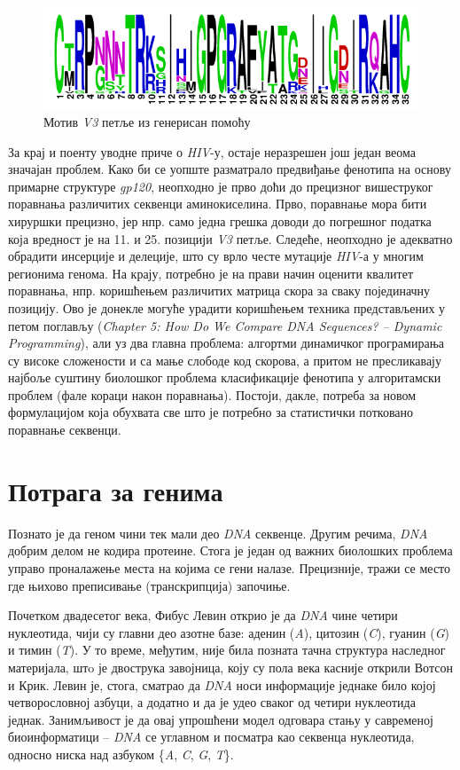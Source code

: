 \documentclass[12pt,oneside]{memoir}
\begin{document}
\begin{CJK}{UTF8}{ipxm}
\begin{figure}[!ht]
  \centering
  \includegraphics[width=.75\textwidth]{motif.png}
  \caption{Мотив \textit{V3} петље из \cite{compeau2015} генерисан помоћу \cite{weblogo}}
  \label{fig:motif}
\end{figure}

За крај и поенту уводне приче о \textit{HIV}-у, остаје неразрешен још један веома значајан проблем. Како би се уопште разматрало предвиђање фенотипа на основу примарне структуре \textit{gp120}, неопходно је прво доћи до прецизног вишеструког поравнања различитих секвенци аминокиселина. Прво, поравнање мора бити хируршки прецизно, јер нпр. само једна грешка доводи до погрешног податка која вредност је на 11. и 25. позицији \textit{V3} петље. Следеће, неопходно је адекватно обрадити инсерције и делеције, што су врло честе мутације \textit{HIV}-а у многим регионима генома. На крају, потребно је на прави начин оценити квалитет поравнања, нпр. коришћењем различитих матрица скора за сваку појединачну позицију. Ово је донекле могуће урадити коришћењем техника представљених у петом поглављу (\textit{Chapter 5: How Do We Compare DNA Sequences? -- Dynamic Programming}), али уз два главна проблема: алгортми динамичког програмирања су високе сложености и са мање слободе код скорова, а притом не пресликавају најбоље суштину биолошког проблема класификације фенотипа у алгоритамски проблем (фале кораци након поравнања). Постоји, дакле, потреба за новом формулацијом која обухвата све што је потребно за статистички потковано поравнање секвенци.

\section{Потрага за генима}
Познато је да геном чини тек мали део \textit{DNA} секвенце. Другим речима, \textit{DNA} добрим делом не кодира протеине. Стога је један од важних биолошких проблема управо проналажење места на којима се гени налазе. Прецизније, тражи се место где њихово преписивање (транскрипција) започиње.

Почетком двадесетог века, Фибус Левин открио је да \textit{DNA} чине четири нуклеотида\cite{levene1910}, чији су главни део азотне базе: аденин (\textit{A}), цитозин (\textit{C}), гуанин (\textit{G}) и тимин (\textit{T}). У то време, међутим, није била позната тачна структура наследног материјала, штo је двострука завојница, коју су пола века касније открили Вотсон и Крик\cite{watson1953}. Левин је, стога, сматрао да \textit{DNA} носи информације једнаке било којој четворословној азбуци, а додатно и да је удео сваког од четири нуклеотида једнак. Занимљивост је да овај упрошћени модел одговара стању у савременој биоинформатици -- \textit{DNA} се углавном и посматра као секвенца нуклеотида, односно ниска над азбуком \{\textit{A}, \textit{C}, \textit{G}, \textit{T}\}.


\end{CJK}
\end{document}
